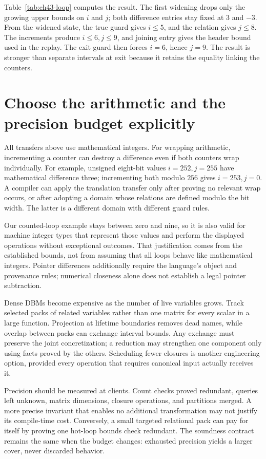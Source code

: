 Table~\ref{tab:ch43-loop} computes the result.
The first widening drops only the growing upper bounds on $i$ and $j$; both difference entries stay fixed at $3$ and $-3$.
From the widened state, the true guard gives $i\leq5$, and the relation gives $j\leq8$.
The increments produce $i\leq6,j\leq9$, and joining entry gives the header bound used in the replay.
The exit guard then forces $i=6$, hence $j=9$.
The result is stronger than separate intervals at exit because it retains the equality linking the counters.

\section{Choose the arithmetic and the precision budget explicitly}
\label{sec:ch43-engineering}

All transfers above use mathematical integers.
For wrapping arithmetic, incrementing a counter can destroy a difference even if both counters wrap individually.
For example, unsigned eight-bit values $i=252,j=255$ have mathematical difference three; incrementing both modulo $256$ gives $i=253,j=0$.
A compiler can apply the translation transfer only after proving no relevant wrap occurs, or after adopting a domain whose relations are defined modulo the bit width.
The latter is a different domain with different guard rules.

Our counted-loop example stays between zero and nine, so it is also valid for machine integer types that represent those values and perform the displayed operations without exceptional outcomes.
That justification comes from the established bounds, not from assuming that all loops behave like mathematical integers.
Pointer differences additionally require the language's object and provenance rules; numerical closeness alone does not establish a legal pointer subtraction.

Dense DBMs become expensive as the number of live variables grows.
Track selected packs of related variables rather than one matrix for every scalar in a large function.
Projection at lifetime boundaries removes dead names, while overlap between packs can exchange interval bounds.
Any exchange must preserve the joint concretization; a reduction may strengthen one component only using facts proved by the others.
Scheduling fewer closures is another engineering option, provided every operation that requires canonical input actually receives it.

Precision should be measured at clients.
Count checks proved redundant, queries left unknown, matrix dimensions, closure operations, and partitions merged.
A more precise invariant that enables no additional transformation may not justify its compile-time cost.
Conversely, a small targeted relational pack can pay for itself by proving one hot-loop bounds check redundant.
The soundness contract remains the same when the budget changes: exhausted precision yields a larger cover, never discarded behavior.


